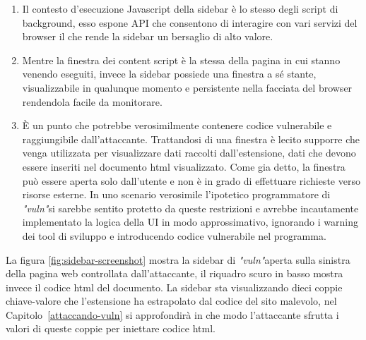 \documentclass{sapthesis}
\newcommand{\Capitolo}[1]{Capitolo~\ref{#1}}
\newcommand{\vuln}{\textit{"vuln"}}
\newcommand{\JS}{Javascript }
\begin{document}
        \begin{enumerate}
            \item Il contesto d'esecuzione \JS della sidebar è lo stesso degli script di background, esso espone
                    API che consentono di interagire con vari servizi del browser il che rende la sidebar un
                    bersaglio di alto valore.

            \item Mentre la finestra dei content script è la stessa della pagina in cui stanno venendo eseguiti,
                    invece la sidebar possiede una finestra a sé stante, visualizzabile in qualunque momento e 
                    persistente nella facciata del browser rendendola facile da monitorare.

            \item È un punto che potrebbe verosimilmente contenere codice vulnerabile e raggiungibile dall'attaccante.
                    Trattandosi di una finestra è lecito supporre che venga utilizzata per visualizzare dati raccolti 
                    dall'estensione, dati che devono essere inseriti nel documento html visualizzato.
                    Come gia detto, la finestra può essere aperta solo dall'utente e non
                    è in grado di effettuare richieste verso risorse esterne. In uno scenario verosimile l'ipotetico programmatore
                    di \vuln si sarebbe sentito protetto da queste restrizioni e avrebbe incautamente implementato
                    la logica della UI in modo approssimativo, ignorando i warning dei tool di
                    sviluppo e introducendo codice vulnerabile nel programma.
        \end{enumerate}

        La figura \ref{fig:sidebar-screenshot} mostra la sidebar di \vuln aperta sulla sinistra della pagina
        web controllata dall'attaccante, il riquadro scuro in basso mostra invece il codice html del documento.
        La sidebar sta visualizzando dieci coppie chiave-valore che l'estensione ha estrapolato dal codice
        del sito malevolo, nel \Capitolo{attaccando-vuln} si approfondirà in che modo l'attaccante sfrutta i
        valori di queste coppie per iniettare codice html.
\end{document}
